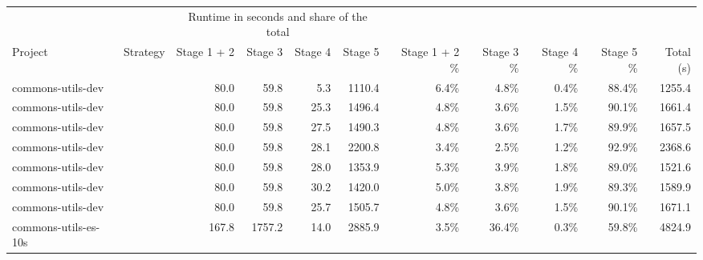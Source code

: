  \renewcommand{\theHreporttablerow}{tab-teralizer-stage-runtimes.\arabic{reporttablerow}}
  \setcounter{reporttablerow}{0}
  \begin{tabular}{llrrrrrrrrr}
  \toprule
   &  & \multicolumn{4}{c}{Runtime in seconds and share of the total} &  &  &  &  &  \\
  \cmidrule(lr){3-6}
  Project & Strategy & Stage 1 + 2 & Stage 3 & Stage 4 & Stage 5 & Stage 1 + 2 \% & Stage 3 \% & Stage 4 \% & Stage 5 \% & Total (s) \\
  \midrule
  {reporttablerow}\label{tabrow:tab-teralizer-stage-runtimes:commons-utils-dev@3ABASELINE}commons-utils-dev & \VariantBaseline{} & 80.0 & 59.8 & 5.3 & 1110.4 & 6.4\% & 4.8\% & 0.4\% & 88.4\% & 1255.4 \\
  {reporttablerow}\label{tabrow:tab-teralizer-stage-runtimes:commons-utils-dev@3ANAIVE_10_TRIES}commons-utils-dev & \VariantNaiveA{} & 80.0 & 59.8 & 25.3 & 1496.4 & 4.8\% & 3.6\% & 1.5\% & 90.1\% & 1661.4 \\
  {reporttablerow}\label{tabrow:tab-teralizer-stage-runtimes:commons-utils-dev@3ANAIVE_50_TRIES}commons-utils-dev & \VariantNaiveB{} & 80.0 & 59.8 & 27.5 & 1490.3 & 4.8\% & 3.6\% & 1.7\% & 89.9\% & 1657.5 \\
  {reporttablerow}\label{tabrow:tab-teralizer-stage-runtimes:commons-utils-dev@3ANAIVE_200_TRIES}commons-utils-dev & \VariantNaiveC{} & 80.0 & 59.8 & 28.1 & 2200.8 & 3.4\% & 2.5\% & 1.2\% & 92.9\% & 2368.6 \\
  {reporttablerow}\label{tabrow:tab-teralizer-stage-runtimes:commons-utils-dev@3AIMPROVED_10_TRIES}commons-utils-dev & \VariantImprovedA{} & 80.0 & 59.8 & 28.0 & 1353.9 & 5.3\% & 3.9\% & 1.8\% & 89.0\% & 1521.6 \\
  {reporttablerow}\label{tabrow:tab-teralizer-stage-runtimes:commons-utils-dev@3AIMPROVED_50_TRIES}commons-utils-dev & \VariantImprovedB{} & 80.0 & 59.8 & 30.2 & 1420.0 & 5.0\% & 3.8\% & 1.9\% & 89.3\% & 1589.9 \\
  {reporttablerow}\label{tabrow:tab-teralizer-stage-runtimes:commons-utils-dev@3AIMPROVED_200_TRIES}commons-utils-dev & \VariantImprovedC{} & 80.0 & 59.8 & 25.7 & 1505.7 & 4.8\% & 3.6\% & 1.5\% & 90.1\% & 1671.1 \\
  \midrule
  {reporttablerow}\label{tabrow:tab-teralizer-stage-runtimes:commons-utils-es-10s@3ABASELINE}commons-utils-es-10s & \VariantBaseline{} & 167.8 & 1757.2 & 14.0 & 2885.9 & 3.5\% & 36.4\% & 0.3\% & 59.8\% & 4824.9 \\

\end{tabular}
